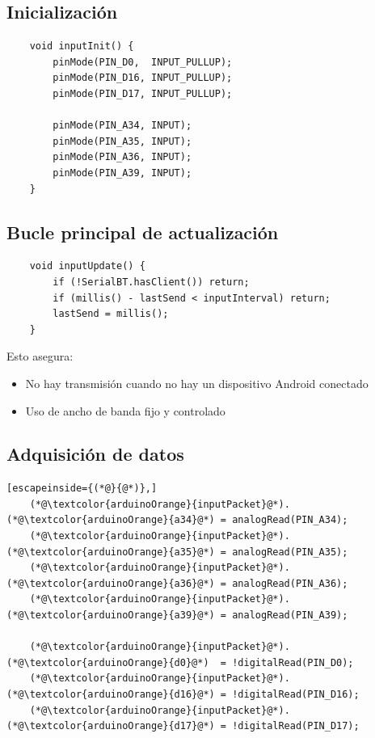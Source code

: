 \documentclass[12pt,a4paper]{article}
\begin{document}
\subsection{Inicialización}

\begin{lstlisting}
	void inputInit() {
		pinMode(PIN_D0,  INPUT_PULLUP);
		pinMode(PIN_D16, INPUT_PULLUP);
		pinMode(PIN_D17, INPUT_PULLUP);
		
		pinMode(PIN_A34, INPUT);
		pinMode(PIN_A35, INPUT);
		pinMode(PIN_A36, INPUT);
		pinMode(PIN_A39, INPUT);
	}
\end{lstlisting}

\subsection{Bucle principal de actualización}

\begin{lstlisting}
	void inputUpdate() {
		if (!SerialBT.hasClient()) return;
		if (millis() - lastSend < inputInterval) return;
		lastSend = millis();
	}
\end{lstlisting}

Esto asegura:
\begin{itemize}
	\item No hay transmisión cuando no hay un dispositivo Android conectado
	\item Uso de ancho de banda fijo y controlado
\end{itemize}

\subsection{Adquisición de datos}

\begin{lstlisting}[escapeinside={(*@}{@*)},]
	(*@\textcolor{arduinoOrange}{inputPacket}@*).(*@\textcolor{arduinoOrange}{a34}@*) = analogRead(PIN_A34);
	(*@\textcolor{arduinoOrange}{inputPacket}@*).(*@\textcolor{arduinoOrange}{a35}@*) = analogRead(PIN_A35);
	(*@\textcolor{arduinoOrange}{inputPacket}@*).(*@\textcolor{arduinoOrange}{a36}@*) = analogRead(PIN_A36);
	(*@\textcolor{arduinoOrange}{inputPacket}@*).(*@\textcolor{arduinoOrange}{a39}@*) = analogRead(PIN_A39);
	
	(*@\textcolor{arduinoOrange}{inputPacket}@*).(*@\textcolor{arduinoOrange}{d0}@*)  = !digitalRead(PIN_D0);
	(*@\textcolor{arduinoOrange}{inputPacket}@*).(*@\textcolor{arduinoOrange}{d16}@*) = !digitalRead(PIN_D16);
	(*@\textcolor{arduinoOrange}{inputPacket}@*).(*@\textcolor{arduinoOrange}{d17}@*) = !digitalRead(PIN_D17);
\end{lstlisting}
\end{document}
